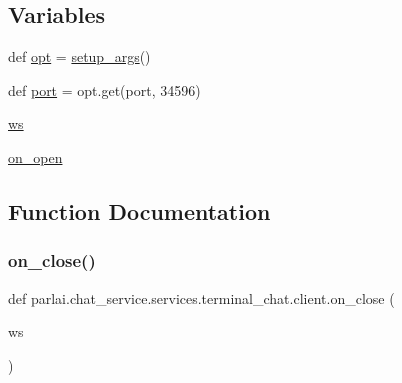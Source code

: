 \subsection*{Variables}
\begin{DoxyCompactItemize}
\item 
def \hyperlink{namespaceparlai_1_1chat__service_1_1services_1_1terminal__chat_1_1client_a81dd583c93ae4a576945c111235c69ec}{opt} = \hyperlink{namespaceparlai_1_1chat__service_1_1services_1_1terminal__chat_1_1client_abcdfe1196113d8ab4476dcde362c83d8}{setup\+\_\+args}()
\item 
def \hyperlink{namespaceparlai_1_1chat__service_1_1services_1_1terminal__chat_1_1client_ac2ab3d6fbc5fdbd9f8305d924c416d79}{port} = opt.\+get(\textquotesingle{}port\textquotesingle{}, 34596)
\item 
\hyperlink{namespaceparlai_1_1chat__service_1_1services_1_1terminal__chat_1_1client_a8cf84390ff82d21619917c2366685540}{ws}
\item 
\hyperlink{namespaceparlai_1_1chat__service_1_1services_1_1terminal__chat_1_1client_a16b659ee0f9fa10a5392cf5a61a424be}{on\+\_\+open}
\end{DoxyCompactItemize}


\subsection{Function Documentation}
\mbox{\label{namespaceparlai_1_1chat__service_1_1services_1_1terminal__chat_1_1client_a02c04f40cfa11defbf5c83bbe46aba00}} 
\subsubsection{\texorpdfstring{on\+\_\+close()}{on\_close()}}
{\footnotesize\ttfamily def parlai.\+chat\+\_\+service.\+services.\+terminal\+\_\+chat.\+client.\+on\+\_\+close (\begin{DoxyParamCaption}\item[{}]{ws }\end{DoxyParamCaption})}

